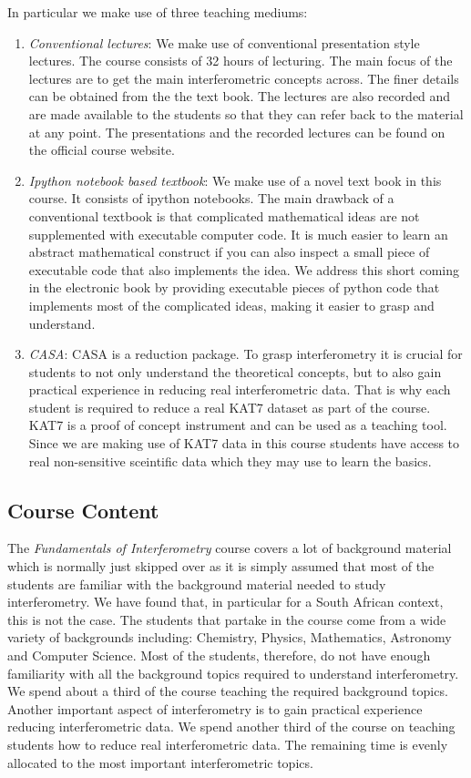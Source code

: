 \documentclass[prb,preprint]{revtex4-1}
\begin{document}
In particular we make use of three teaching mediums:

\begin{enumerate}
 \item \textit{Conventional lectures}: We make use of conventional presentation style lectures. The course 
 consists of 32 hours of lecturing. The main focus of the lectures are to get the main interferometric concepts across. The finer details  
 can be obtained from the the text book. The lectures are also recorded and are made available to the students so that they can refer back to the material at any point.
 The presentations and the recorded lectures can be found on the official course website.
 \item \textit{Ipython notebook based textbook}: We make use of a novel text book in this course. It consists of ipython notebooks. The main drawback of a conventional 
 textbook is that complicated mathematical ideas are not supplemented with executable computer code. It is much easier to learn an abstract mathematical construct 
 if you can also inspect a small piece of executable code that also implements the idea. We address this short coming in the electronic book by providing 
 executable pieces of python code that implements most of the complicated ideas, making it easier to grasp and understand.
 \item \textit{\textsc{CASA}}: \textsc{CASA} is a reduction package. To grasp interferometry it is crucial for students to not only understand the theoretical concepts, but to also gain 
 practical experience in reducing real interferometric data. That is why each student is required to reduce a real KAT7 dataset as part of the course. KAT7 is a proof of concept instrument and can be used as a teaching tool. 
 Since we are making use of KAT7 data in this course students have access to real non-sensitive sceintific data which they may use to learn the basics. 
\end{enumerate}

\subsection{Course Content}
\label{sec:course_content}
The \textit{Fundamentals of Interferometry} course covers a lot of background material which is normally just 
skipped over as it is simply assumed that most of the students are familiar with the background material needed to study interferometry. We have found that, in particular for a South African context, this is not the case.
The students that partake in the course come from a wide variety of backgrounds including: Chemistry, Physics, Mathematics, Astronomy and Computer Science. Most of the students, therefore, do not have enough familiarity with all
the background topics required to understand interferometry. We spend about a third of the course teaching the required background topics.
Another important aspect of interferometry is to gain practical experience reducing interferometric data. We spend another third of the course on teaching students 
how to reduce real interferometric data. The remaining time is evenly allocated to the most important interferometric topics.
\end{document}
